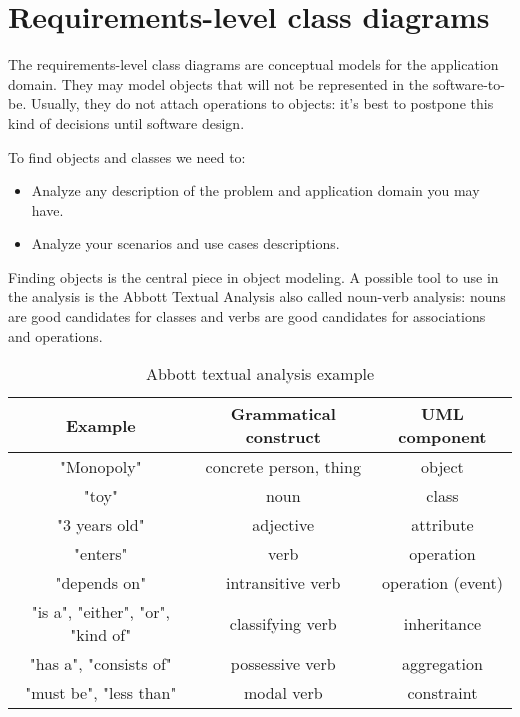 \section{Requirements-level class diagrams}

The requirements-level class diagrams are conceptual models for the application domain. 
They may model objects that will not be represented in the software-to-be. 
Usually, they do not attach operations to objects: it's best to postpone this kind of decisions until software design. 
    
To find objects and classes we need to:
\begin{itemize}
    \item Analyze any description of the problem and application domain you may have.
    \item Analyze your scenarios and use cases descriptions.
\end{itemize}
Finding objects is the central piece in object modeling. 
A possible tool to use in the analysis is the Abbott Textual Analysis also called noun-verb analysis: nouns are good candidates for classes and verbs are good candidates for associations and operations. 
\begin{table}[H]
    \centering
    \begin{tabular}{ccc}
    \textbf{Example}                  & \textbf{Grammatical construct} & \textbf{UML component} \\ \hline
    "Monopoly"                        & concrete person, thing         & object                 \\
    "toy"                             & noun                           & class                  \\ \hline
    "3 years old"                     & adjective                      & attribute              \\ \hline
    "enters"                          & verb                           & operation              \\
    "depends on"                      & intransitive verb              & operation (event)      \\ \hline
    "is a", "either", "or", "kind of" & classifying verb               & inheritance            \\ \hline
    "has a", "consists of"            & possessive verb                & aggregation            \\ \hline
    "must be", "less than"            & modal verb                     & constraint             \\ \hline
    \end{tabular}
    \caption{Abbott textual analysis example}
\end{table}